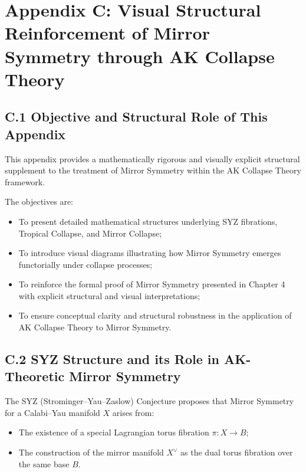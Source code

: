 \documentclass[11pt]{article}
\begin{document}
\section*{Appendix C: Visual Structural Reinforcement of Mirror Symmetry through AK Collapse Theory}

\subsection*{C.1 Objective and Structural Role of This Appendix}

This appendix provides a mathematically rigorous and visually explicit structural supplement to the treatment of Mirror Symmetry within the AK Collapse Theory framework.

The objectives are:

\begin{itemize}
    \item To present detailed mathematical structures underlying SYZ fibrations, Tropical Collapse, and Mirror Collapse;
    \item To introduce visual diagrams illustrating how Mirror Symmetry emerges functorially under collapse processes;
    \item To reinforce the formal proof of Mirror Symmetry presented in Chapter 4 with explicit structural and visual interpretations;
    \item To ensure conceptual clarity and structural robustness in the application of AK Collapse Theory to Mirror Symmetry.
\end{itemize}

\subsection*{C.2 SYZ Structure and its Role in AK-Theoretic Mirror Symmetry}

The SYZ (Strominger--Yau--Zaslow) Conjecture proposes that Mirror Symmetry for a Calabi--Yau manifold $X$ arises from:

\begin{itemize}
    \item The existence of a special Lagrangian torus fibration $\pi: X \to B$;
    \item The construction of the mirror manifold $X^\vee$ as the dual torus fibration over the same base $B$.
\end{itemize}
\end{document}
